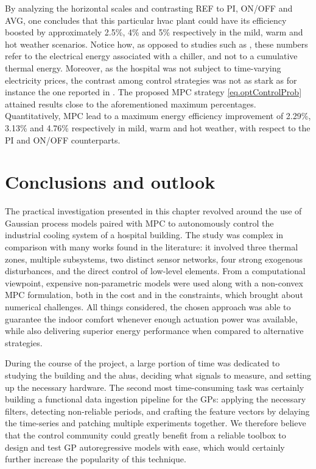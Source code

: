 By analyzing the horizontal scales and contrasting REF to PI, ON/OFF and AVG, one concludes that this particular \ac{hvac} plant could have its efficiency boosted by approximately 2.5\%, 4\% and 5\% respectively in the mild, warm and hot weather scenarios. Notice how, as opposed to studies such as \cite{bunning2020experimental}, these numbers refer to the electrical energy associated with a chiller, and not to a cumulative thermal energy. Moreover, as the hospital was not subject to time-varying electricity prices, the contrast among control strategies was not as stark as for instance the one reported in \cite{joe2022investigation}. The proposed MPC strategy \eqref{eq.optControlProb} attained results close to the aforementioned maximum percentages. Quantitatively, MPC lead to a maximum energy efficiency improvement of 2.29\%, 3.13\% and 4.76\% respectively in mild, warm and hot weather, with respect to the PI and ON/OFF counterparts.

\section{Conclusions and outlook}

The practical investigation presented in this chapter revolved around the use of Gaussian process models paired with MPC to autonomously control the industrial cooling system of a hospital building. The study was complex in comparison with many works found in the literature: it involved three thermal zones, multiple subsystems, two distinct sensor networks, four strong exogenous disturbances, and the direct control of low-level elements. From a computational viewpoint, expensive non-parametric models were used along with a non-convex MPC formulation, both in the cost and in the constraints, which brought about numerical challenges. All things considered, the chosen approach was able to guarantee the indoor comfort whenever enough actuation power was available, while also delivering superior energy performance when compared to alternative strategies.

During the course of the project, a large portion of time was dedicated to studying the building and the \acp{ahu}, deciding what signals to measure, and setting up the necessary hardware. The second most time-consuming task was certainly building a functional data ingestion pipeline for the GPs: applying the necessary filters, detecting non-reliable periods, and crafting the feature vectors by delaying the time-series and patching multiple experiments together. We therefore believe that the control community could greatly benefit from a reliable toolbox to design and test GP autoregressive models with ease, which would certainly further increase the popularity of this technique. 

